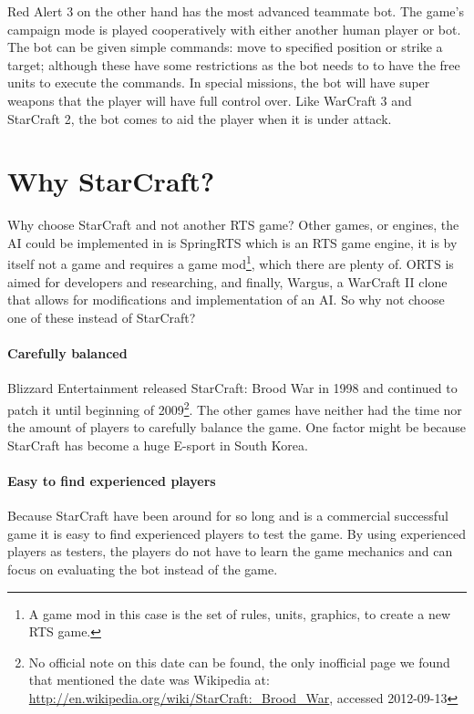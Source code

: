 Red Alert 3\cite{redalert3} on the other hand has the most advanced teammate bot. The game’s campaign mode is played cooperatively with either another human player or bot. The bot can be given simple commands: move to specified position or strike a target; although these have some restrictions as the bot needs to to have the free units to execute the commands. In special missions, the bot will have super weapons that the player will have full control over. Like WarCraft 3 and StarCraft 2, the bot comes to aid the player when it is under attack.

\section{Why StarCraft?}
\label{sec:why_starcraft}	
Why choose StarCraft and not another RTS game? Other games, or engines, the AI could be implemented in is SpringRTS\cite{springrts} which is an RTS game engine, it is by itself not a game and requires a game mod\footnote{A game mod in this case is the set of rules, units, graphics, to create a new RTS game.}, which there are plenty of. ORTS\cite{orts} is aimed for developers and researching, and finally, Wargus\cite{wargus}, a WarCraft II clone that allows for modifications and implementation of an AI. So why not choose one of these instead of StarCraft?

\paragraph{Carefully balanced}
Blizzard Entertainment released StarCraft: Brood War in 1998 and continued to patch it until beginning of 2009\footnote{No official note on this date can be found, the only inofficial page we found that mentioned the date was Wikipedia at: \url{http://en.wikipedia.org/wiki/StarCraft:_Brood_War}, accessed 2012-09-13}. The other games have neither had the time nor the amount of players to carefully balance the game. One factor might be because StarCraft has become a huge E-sport in South Korea\cite{scKotakuKorea}.

\paragraph{Easy to find experienced players}
Because StarCraft have been around for so long and is a commercial successful game it is easy to find experienced players to test the game. By using experienced players as testers, the players do not have to learn the game mechanics and can focus on evaluating the bot instead of the game.

